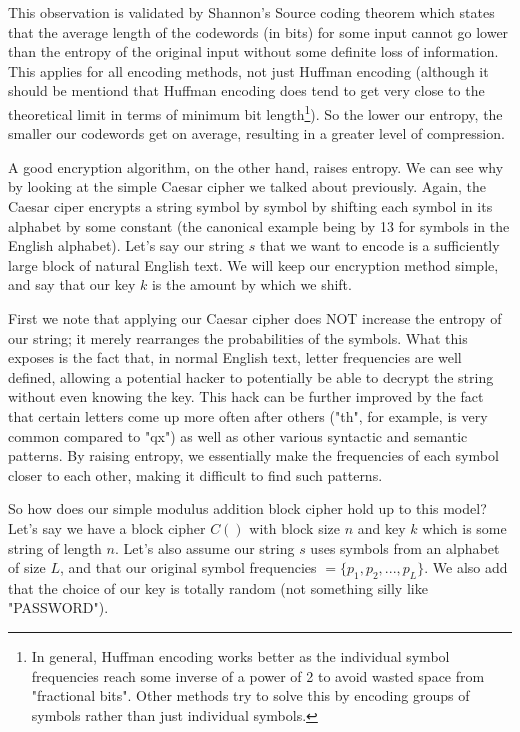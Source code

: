 \documentclass[11pt]{article}
\begin{document}
This observation is validated by Shannon's Source coding theorem\cite{shannon} which states that the average 
length of the codewords (in bits) 
for some input cannot go lower than the entropy of the original input without some definite loss of information. 
This applies for all encoding methods, not just Huffman encoding (although it should be mentiond that Huffman encoding 
does tend to get very close to the theoretical limit in terms of minimum bit length\footnote{ 
In general, Huffman encoding works better as the individual symbol frequencies reach some inverse of a power of 2 
to avoid wasted space from "fractional bits". Other methods try to solve this by encoding groups of symbols rather than 
just individual symbols.}). 
So the lower our entropy, the smaller our codewords get on average, resulting in a greater level of compression.

A good encryption algorithm, on the other hand, raises entropy. We can see why by looking at the simple Caesar cipher 
we talked about previously. Again, the Caesar ciper encrypts a string symbol by symbol by shifting each symbol 
in its alphabet by some constant (the canonical example being by 13 for symbols in the English alphabet). 
Let's say our string $s$ that we want to encode is a sufficiently large block of natural English text. We will keep our 
encryption method simple, and say that our key $k$ is the amount by which we shift.

First we note that applying our Caesar cipher does NOT increase the entropy of our string; 
it merely rearranges the probabilities of the symbols. What this exposes is the fact that, in normal English text, 
letter frequencies are well defined, allowing a potential hacker to potentially be able to decrypt 
the string without even knowing the key. This hack can be further improved by the fact that certain letters come 
up more often after others ("th", for example, is very common compared to "qx") as well as other various syntactic 
and semantic patterns. By raising entropy, we essentially make the frequencies of each symbol closer to each other, 
making it difficult to find such patterns.

So how does our simple modulus addition block cipher hold up to this model? Let's say we have a block cipher $C()$ with 
block size $n$ and key $k$ which is some string of length $n$. Let's also assume our string $s$ uses symbols from 
an alphabet of size $L$, and that our original symbol frequencies $=\{p_1,p_2,...,p_L\}$. We also add that 
the choice of our key is totally random (not something silly like "PASSWORD").
\end{document}
